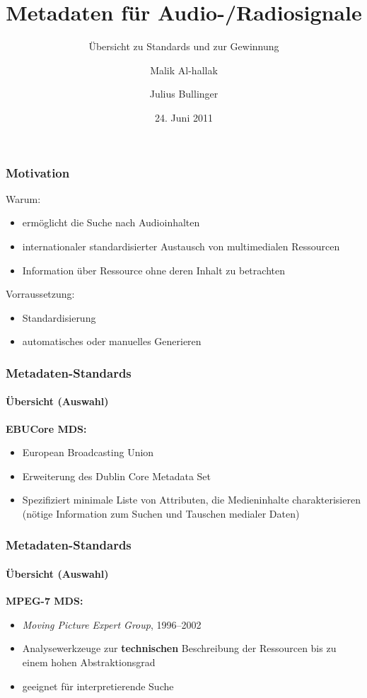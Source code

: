 \documentclass[14pt]{beamer}
\title{Metadaten für Audio-/Radiosignale}
\subtitle{Übersicht zu Standards und zur Gewinnung}
\author[M. Al-hallak, J. Bullinger]
{Malik Al-hallak \and Julius Bullinger}
\institute[Uni Weimar]{Bauhaus-Universität Weimar \\
Fakultät Medien \\
Bereich Vernetzte Medien \\
Audiotechnik}
\date{24. Juni 2011}
\begin{document}
\begin{frame}
	\titlepage
\end{frame}

\begin{frame}
	\frametitle{Motivation}
	
	Warum:
		\begin{itemize}
			\pause \item ermöglicht die Suche nach Audioinhalten
			\pause \item internationaler standardisierter Austausch von multimedialen Ressourcen
			\pause \item Information über Ressource ohne deren Inhalt zu betrachten\\
		\end{itemize}
		\pause 
	\vspace{.5cm}Vorraussetzung:
		\begin{itemize}
			\pause \item Standardisierung
			\pause \item automatisches oder manuelles Generieren
		\end{itemize}

\end{frame}

\begin{frame}
	\frametitle{Metadaten-Standards}
	\framesubtitle{Übersicht (Auswahl)}
\textbf{EBUCore MDS:}
	\begin{itemize}
		\pause \item European Broadcasting Union
		\pause \item Erweiterung des Dublin Core Metadata Set
		\pause \item Spezifiziert minimale Liste von Attributen, die Medieninhalte charakterisieren (nötige Information zum Suchen und Tauschen medialer Daten)
	\end{itemize}
\end{frame}



\begin{frame}
	\frametitle{Metadaten-Standards}
	\framesubtitle{Übersicht (Auswahl)}
	
	\textbf{MPEG-7 MDS:} \\
	\begin{itemize}
		\pause \item \emph{Moving Picture Expert Group}, 1996--2002
		\pause \item Analysewerkzeuge zur \textbf{technischen} Beschreibung der Ressourcen bis zu einem hohen Abstraktionsgrad
		\pause \item geeignet für interpretierende Suche
	\end{itemize}
\end{frame}
\end{document}
